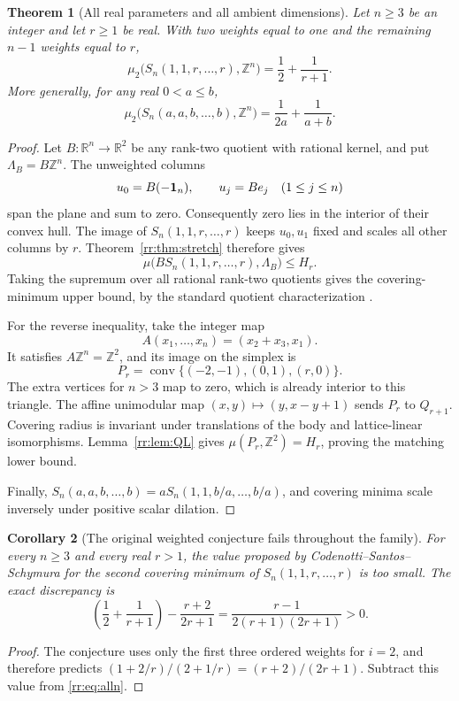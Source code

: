 \documentclass[11pt,a4paper]{article}
\newtheorem{theorem}{Theorem}[section]
\newtheorem{corollary}[theorem]{Corollary}
\theoremstyle{remark}\newtheorem{remark}[theorem]{Remark}
\DeclareMathOperator{\conv}{conv}
\newcommand{\R}{\mathbb R}\newcommand{\Z}{\mathbb Z}\newcommand{\Q}{\mathbb Q}
\begin{document}
\begin{theorem}[All real parameters and all ambient dimensions]
\label{rr:thm:alln}
Let $n\ge3$ be an integer and let $r\ge1$ be real.  With two
weights equal to one and the remaining $n-1$ weights equal to $r$,
\begin{equation}\label{rr:eq:alln}
 \boxed{\displaystyle
 \mu_2\bigl(S_n(1,1,r,\ldots,r),\Z^n\bigr)
 =\frac12+\frac1{r+1}.}
\end{equation}
More generally, for any real $0<a\le b$,
\begin{equation}\label{rr:eq:ab}
 \boxed{\displaystyle
 \mu_2\bigl(S_n(a,a,b,\ldots,b),\Z^n\bigr)
 =\frac1{2a}+\frac1{a+b}.}
\end{equation}
\end{theorem}
\begin{proof}
Let $B:\R^n\to\R^2$ be any rank-two quotient with rational
kernel, and put $\Lambda_B=B\Z^n$.  The unweighted columns
\[
 u_0=B(-\mathbf1_n),\qquad u_j=Be_j\quad(1\le j\le n)
\]
span the plane and sum to zero.  Consequently zero lies in the
interior of their convex hull.  The image of
$S_n(1,1,r,\ldots,r)$ keeps $u_0,u_1$ fixed and scales all other
columns by $r$.  Theorem~\ref{rr:thm:stretch} therefore gives
\[
 \mu\bigl(BS_n(1,1,r,\ldots,r),\Lambda_B\bigr)\le H_r.
\]
Taking the supremum over all rational rank-two quotients gives
the covering-minimum upper bound, by the standard quotient
characterization \cite[Section 1]{CSS}.

For the reverse inequality, take the integer map
\[
 A(x_1,\ldots,x_n)=(x_2+x_3,x_1).
\]
It satisfies $A\Z^n=\Z^2$, and its image on the simplex is
\[
 P_r=\conv\{(-2,-1),(0,1),(r,0)\}.
\]
The extra vertices for $n>3$ map to zero, which is already
interior to this triangle.  The affine unimodular map
$(x,y)\mapsto(y,x-y+1)$ sends $P_r$ to $Q_{r+1}$.
Covering radius is invariant under translations of the body
and lattice-linear isomorphisms.  Lemma~\ref{rr:lem:QL} gives
$\mu(P_r,\Z^2)=H_r$, proving the matching lower bound.

Finally,
$S_n(a,a,b,\ldots,b)=aS_n(1,1,b/a,\ldots,b/a)$, and covering
minima scale inversely under positive scalar dilation.
\end{proof}

\begin{corollary}[The original weighted conjecture fails throughout the family]
\label{rr:cor:conjecture}
For every $n\ge3$ and every real $r>1$, the value proposed by
Codenotti--Santos--Schymura \cite[Conjecture 5.3]{CSS} for the
second covering minimum of $S_n(1,1,r,\ldots,r)$ is too small.
The exact discrepancy is
\begin{equation}\label{rr:eq:gap}
 \left(\frac12+\frac1{r+1}\right)-\frac{r+2}{2r+1}
 =\frac{r-1}{2(r+1)(2r+1)}>0.
\end{equation}
\end{corollary}
\begin{proof}
The conjecture uses only the first three ordered weights for
$i=2$, and therefore predicts
$(1+2/r)/(2+1/r)=(r+2)/(2r+1)$.  Subtract this value from
\eqref{rr:eq:alln}.
\end{proof}
\end{document}
